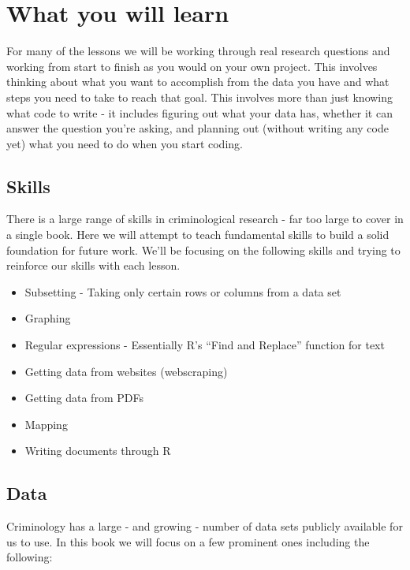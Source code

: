 \documentclass[
  12pt,
  openany]{book}
\providecommand{\tightlist}{%
  \setlength{\itemsep}{0pt}\setlength{\parskip}{0pt}}
\begin{document}
\hypertarget{what-you-will-learn}{%
\section{What you will learn}\label{what-you-will-learn}}

For many of the lessons we will be working through real research questions and working from start to finish as you would on your own project. This involves thinking about what you want to accomplish from the data you have and what steps you need to take to reach that goal. This involves more than just knowing what code to write - it includes figuring out what your data has, whether it can answer the question you're asking, and planning out (without writing any code yet) what you need to do when you start coding.

\hypertarget{skills}{%
\subsection{Skills}\label{skills}}

There is a large range of skills in criminological research - far too large to cover in a single book. Here we will attempt to teach fundamental skills to build a solid foundation for future work. We'll be focusing on the following skills and trying to reinforce our skills with each lesson.

\begin{itemize}
\tightlist
\item
  Subsetting - Taking only certain rows or columns from a data set
\item
  Graphing
\item
  Regular expressions - Essentially R's ``Find and Replace'' function for text
\item
  Getting data from websites (webscraping)
\item
  Getting data from PDFs
\item
  Mapping
\item
  Writing documents through R
\end{itemize}

\hypertarget{data}{%
\subsection{Data}\label{data}}

Criminology has a large - and growing - number of data sets publicly available for us to use. In this book we will focus on a few prominent ones including the following:
\end{document}

